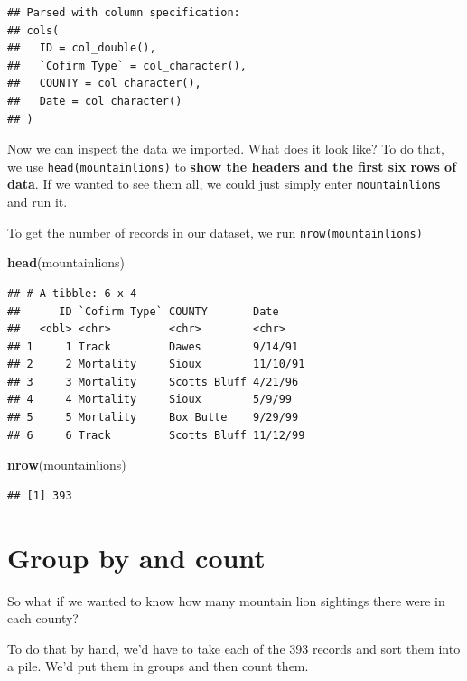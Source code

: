 \documentclass[]{book}
\newenvironment{Shaded}{\begin{snugshade}}{\end{snugshade}}
\newcommand{\KeywordTok}[1]{\textcolor[rgb]{0.13,0.29,0.53}{\textbf{#1}}}
\newcommand{\NormalTok}[1]{#1}
\begin{document}
\begin{verbatim}
## Parsed with column specification:
## cols(
##   ID = col_double(),
##   `Cofirm Type` = col_character(),
##   COUNTY = col_character(),
##   Date = col_character()
## )
\end{verbatim}

Now we can inspect the data we imported. What does it look like? To do that, we use \texttt{head(mountainlions)} to \textbf{show the headers and the first six rows of data}. If we wanted to see them all, we could just simply enter \texttt{mountainlions} and run it.

To get the number of records in our dataset, we run \texttt{nrow(mountainlions)}

\begin{Shaded}
\begin{Highlighting}[]
\KeywordTok{head}\NormalTok{(mountainlions)}
\end{Highlighting}
\end{Shaded}

\begin{verbatim}
## # A tibble: 6 x 4
##      ID `Cofirm Type` COUNTY       Date    
##   <dbl> <chr>         <chr>        <chr>   
## 1     1 Track         Dawes        9/14/91 
## 2     2 Mortality     Sioux        11/10/91
## 3     3 Mortality     Scotts Bluff 4/21/96 
## 4     4 Mortality     Sioux        5/9/99  
## 5     5 Mortality     Box Butte    9/29/99 
## 6     6 Track         Scotts Bluff 11/12/99
\end{verbatim}

\begin{Shaded}
\begin{Highlighting}[]
\KeywordTok{nrow}\NormalTok{(mountainlions)}
\end{Highlighting}
\end{Shaded}

\begin{verbatim}
## [1] 393
\end{verbatim}

\hypertarget{group-by-and-count}{%
\section{Group by and count}\label{group-by-and-count}}

So what if we wanted to know how many mountain lion sightings there were in each county?

To do that by hand, we'd have to take each of the 393 records and sort them into a pile. We'd put them in groups and then count them.
\end{document}
